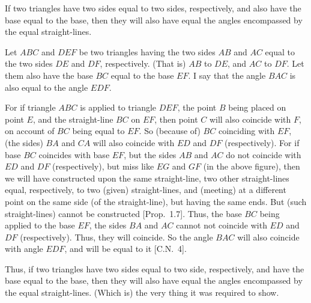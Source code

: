 \begin{Parallel}{}{}
{If two triangles have  two sides equal to two sides, respectively, 
and also have the base equal to the base, then they will
also have equal the angles  encompassed by
the equal straight-lines.

\epsfysize=1.75in
\centerline{}

Let $ABC$ and $DEF$ be two triangles having the two sides $AB$ and $AC$ equal to the two
sides $DE$ and $DF$, respectively. (That is) $AB$ to $DE$, and $AC$ to $DF$.  Let them also have
the base $BC$ equal to the base $EF$. I say that the angle $BAC$ is also equal
to the angle $EDF$.

For if triangle $ABC$ is applied to triangle $DEF$, the point $B$ being placed on
point $E$, and the straight-line $BC$ on $EF$, then point $C$ will also coincide with $F$, on
account of $BC$ being equal to $EF$.
So  (because of) $BC$ coinciding with $EF$,  (the sides) $BA$ and $CA$ will also
coincide with  $ED$ and $DF$ (respectively). 
For if base $BC$ coincides with base $EF$, but the sides $AB$ and $AC$ 
do not coincide with $ED$ and $DF$ (respectively), but miss like $EG$
and $GF$ (in the above figure), 
then we will have constructed upon the same straight-line, two other straight-lines equal, respectively, to two (given) straight-lines,  and (meeting)
at a different point on the same
side (of the straight-line), but having the same ends. But (such straight-lines) cannot be constructed [Prop.~1.7].
Thus,  the base $BC$ being applied to the  base $EF$,  the sides $BA$ and $AC$
cannot not coincide with $ED$ and $DF$ (respectively). Thus, they
will coincide. So the angle $BAC$ will also coincide with angle $EDF$,
and will be equal to it [C.N.~4].

Thus, if two triangles have  two  sides equal to two side, respectively,
and  have the base equal to the base, then they will also have equal the angles  encompassed by
the equal straight-lines. (Which is) the very thing it was required to show.}
\end{Parallel}

